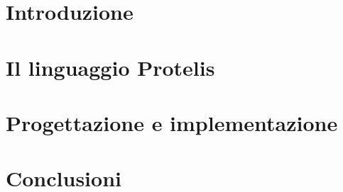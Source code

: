 \documentclass{article}
\begin{document}
\newpage
\tableofcontents
\newpage

\section{Introduzione}



\section{Il linguaggio Protelis}



\section{Progettazione e implementazione}



\section{Conclusioni}
\end{document}
